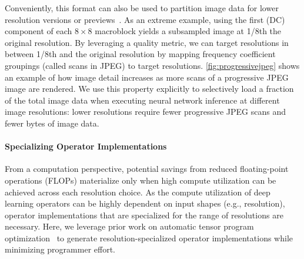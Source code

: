 Conveniently, this format can also be used to partition image data for lower resolution versions or previews~\cite{yan2017customizing}.
As an extreme example, using the first (DC) component of each $8\times8$ macroblock yields a subsampled image at 1/8th the original resolution.
By leveraging a quality metric, we can target resolutions in between 1/8th and the original resolution by mapping frequency coefficient groupings (called scans in JPEG) to target resolutions.
\autoref{fig:progressivejpeg} shows an example of how image detail increases as more scans of a progressive JPEG image are rendered.
We use this property explicitly to selectively load a fraction of the total image data when executing neural network inference at different image resolutions: lower resolutions require fewer progressive JPEG scans and fewer bytes of image data.

\paragraph{Specializing Operator Implementations}
From a computation perspective, potential savings from reduced floating-point operations (FLOPs) materialize only when high compute utilization can be achieved across each resolution choice.
As the compute utilization of deep learning operators can be highly dependent on input shapes (e.g., resolution), operator implementations that are specialized for the range of resolutions are necessary.
Here, we leverage prior work on automatic tensor program optimization~\cite{chen2018learning, ragan2013halide} to generate resolution-specialized operator implementations while minimizing programmer effort.





